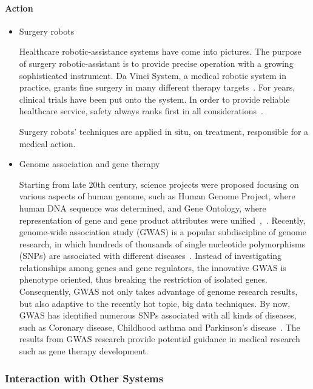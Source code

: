 \documentclass[letterpaper, twocolumn, 10pt, conference]{IEEEtran}
\begin{document}
\paragraph{Action}
\begin{itemize} 
\item Surgery robots


Healthcare robotic-assistance systems have come into pictures. The purpose of surgery robotic-assistant is to provide precise operation with a growing sophisticated instrument. Da Vinci System, a medical robotic system in practice, grants fine surgery in many different therapy targets~\cite{hc_paper_30,hc_paper_32}. For years, clinical trials have been put onto the system. In order to provide reliable healthcare service, safety always ranks first in all considerations~\cite{hc_paper_32}.


Surgery robots' techniques are applied in situ, on treatment, responsible for a medical action.

\item Genome association and gene therapy


Starting from late 20th century, science projects were proposed focusing on various aspects of human genome, such as Human Genome Project, where human DNA sequence was determined, and Gene Ontology, where representation of gene and gene product attributes were unified~\cite{lee2013human},~\cite{gene2007gene}. Recently, genome-wide association study (GWAS) is a popular subdiscipline of genome research, in which hundreds of thousands of single nucleotide polymorphisms (SNPs) are associated with different diseases~\cite{manolio2010genomewide}. Instead of investigating relationships among genes and gene regulators, the innovative GWAS is phenotype oriented, thus breaking the restriction of isolated genes. Consequently, GWAS not only takes advantage of genome research results, but also adaptive to the recently hot topic, big data techniques. By now, GWAS has identified numerous SNPs associated with all kinds of diseases, such as Coronary disease, Childhood asthma and Parkinson’s disease~\cite{visscher201710}. The results from GWAS research provide potential guidance in medical research such as gene therapy development.


\end{itemize}








\subsubsection{Interaction with Other Systems}
\label{sssec:cgh:smart_health:interaction}
\end{document}
